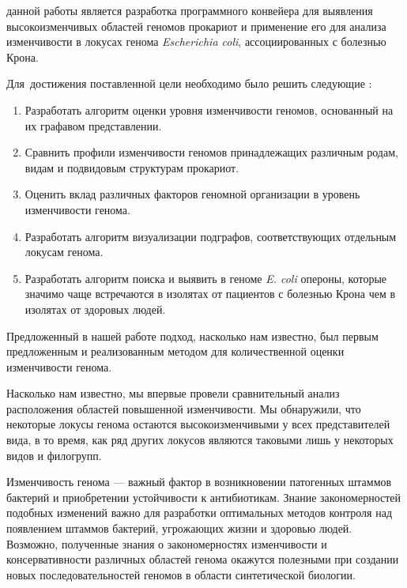{\aim} данной работы является разработка программного конвейера для выявления высокоизменчивых областей геномов прокариот и применение его для анализа изменчивости в локусах генома \textit{Escherichia coli}, ассоциированных с болезнью Крона.


Для~достижения поставленной цели необходимо было решить следующие {\tasks}:
\begin{enumerate}[beginpenalty=10000] 
  \item Разработать алгоритм оценки уровня изменчивости геномов, основанный на их графавом представлении.
  \item Сравнить профили изменчивости геномов принадлежащих различным родам, видам и подвидовым структурам прокариот.
  \item Оценить вклад различных факторов геномной организации в уровень изменчивости генома. 
  \item Разработать алгоритм визуализации подграфов, соответствующих отдельным локусам генома.
  \item Разработать алгоритм поиска и выявить в геноме \textit{E. coli} опероны, которые значимо чаще встречаются в изолятах от пациентов с болезнью Крона чем в изолятах от здоровых людей.  
\end{enumerate}


{\novelty}
Предложенный в нашей работе подход, насколько нам известно, был первым предложенным и реализованным методом для количественной оценки изменчивости генома. 

Насколько нам известно, мы впервые провели сравнительный анализ расположения областей повышенной изменчивости. Мы обнаружили, что некоторые локусы генома остаются высокоизменчивыми у всех представителей вида, в то время, как ряд других локусов являются таковыми лишь у некоторых видов и филогрупп. 

{\influence} 

Изменчивость генома --- важный фактор в возникновении патогенных штаммов бактерий и приобретении устойчивости к антибиотикам. Знание закономерностей подобных изменений важно для разработки оптимальных методов контроля над появлением штаммов бактерий, угрожающих жизни и здоровью людей. Возможно, полученные знания о закономерностях изменчивости и консервативности различных областей генома окажутся полезными при создании новых последовательностей геномов в области синтетической биологии. 

